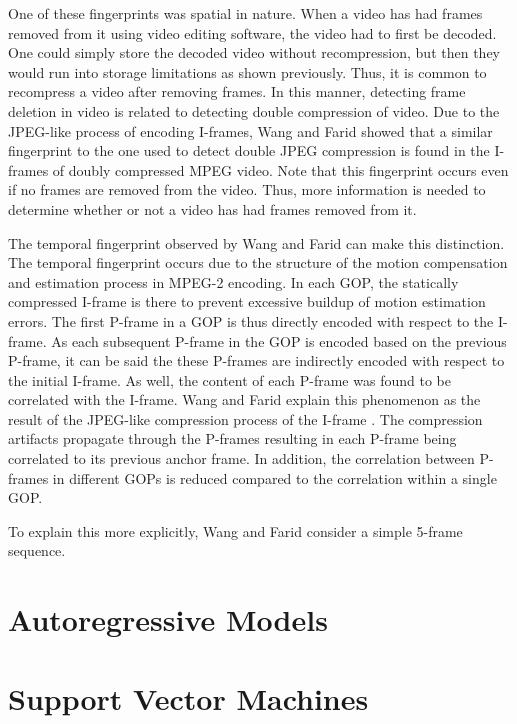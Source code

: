 One of these fingerprints was spatial in nature. When a video has had frames removed from it using video editing software, the video had to first be decoded. One could simply store the decoded video without recompression, but then they would run into storage limitations as shown previously. Thus, it is common to recompress a video after removing frames. In this manner, detecting frame deletion in video is related to detecting double compression of video. Due to the JPEG-like process of encoding I-frames, Wang and Farid showed that a similar fingerprint to the one used to detect double JPEG compression \cite{doubleJPEG} \cite{doubleJPEG2} is found in the I-frames of doubly compressed MPEG video. Note that this fingerprint occurs even if no frames are removed from the video. Thus, more information is needed to determine whether or not a video has had frames removed from it.

The temporal fingerprint observed by Wang and Farid can make this distinction. The temporal fingerprint occurs due to the structure of the motion compensation and estimation process in MPEG-2 encoding. In each GOP, the statically compressed I-frame is there to prevent excessive buildup of motion estimation errors. The first P-frame in a GOP is thus directly encoded with respect to the I-frame. As each subsequent P-frame in the GOP is encoded based on the previous P-frame, it can be said the these P-frames are indirectly encoded with respect to the initial I-frame. As well, the content of each P-frame was found to be correlated with the I-frame. Wang and Farid explain this phenomenon as the result of the JPEG-like compression process of the I-frame \cite{wang}. The compression artifacts propagate through the P-frames resulting in each P-frame being correlated to its previous anchor frame. In addition, the correlation between P-frames in different GOPs is reduced compared to the correlation within a single GOP.

To explain this more explicitly, Wang and Farid consider a simple 5-frame sequence.

\section{Autoregressive Models}

\section{Support Vector Machines}